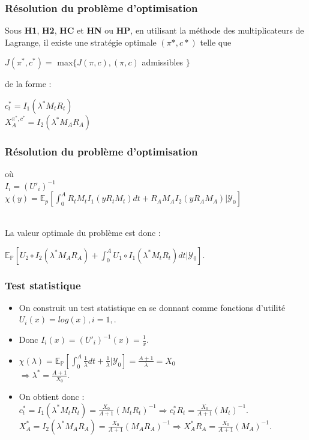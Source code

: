 \documentclass[french]{beamer}
\begin{document}
\begin{frame}
\frametitle{Résolution du problème d'optimisation}
Sous \textbf{H1}, \textbf{H2}, \textbf{HC} et \textbf{HN} ou \textbf{HP}, en utilisant la méthode des multiplicateurs de Lagrange, il existe une stratégie optimale $(\pi*, c*)$ telle que 
\begin{center}
$J(\pi^*, c^*) =$ max$\{ J(\pi, c), (\pi, c)$ admissibles $\}$
\end{center}
 de la forme : 
\begin{center}
$c^*_t = I_1(\lambda^* M_t R_t)$\\
$X^{\pi^*, c^*}_A = I_2(\lambda^* M_A R_A)$\\
\end{center}
\end{frame}

\begin{frame}
\frametitle{Résolution du problème d'optimisation}
où \\
$I_i = (U'_i)^{-1}$ \\
$\chi (y) = \mathbb{E}_p[\int_{0}^{A} R_t M_t I_1(yR_t M_t)dt + R_A M_A I_2(yR_A M_A) | \mathcal{Y}_0]$\\
\

La valeur optimale du problème est donc : 
\begin{center}
$\mathbb{E}_{\mathbb{P}} [ U_2 \circ I_2 (\lambda^* M_A R_A) + \int_{0}^{A} U_1 \circ I_1 (\lambda^* M_t R_t)dt | \mathcal{Y}_0]$.
\end{center}
\end{frame}

\begin{frame}
\frametitle{Test statistique}
\begin{itemize}
\item On construit un test statistique en se donnant comme fonctions d'utilité $U_i (x) = log(x), i = 1, $.
\item Donc $I_i (x) = (U'_i)^{-1}(x) = \frac{1}{x}$.
\item $\chi(\lambda) = \mathbb{E}_{\mathbb{P}}[\int_{0}^{A} \frac{1}{\lambda}dt + \frac{1}{\lambda}|\mathcal{Y}_0] = \frac{A+1}{\lambda} = X_0$\\
$\Rightarrow \lambda^* = \frac{A+1}{X_0}$.
\item On obtient donc : \\
$c^*_t = I_1(\lambda^* M_t R_t) = \frac{X_0}{A+1} (M_t R_t)^{-1} \Rightarrow c^*_t R_t= \frac{X_0}{A+1} (M_t)^{-1}$.
$X^*_A = I_2(\lambda^* M_A R_A) = \frac{X_0}{A+1} (M_A R_A)^{-1} \Rightarrow X^*_A R_A= \frac{X_0}{A+1} (M_A)^{-1}$.
\end{itemize}
\end{frame}
\end{document}
